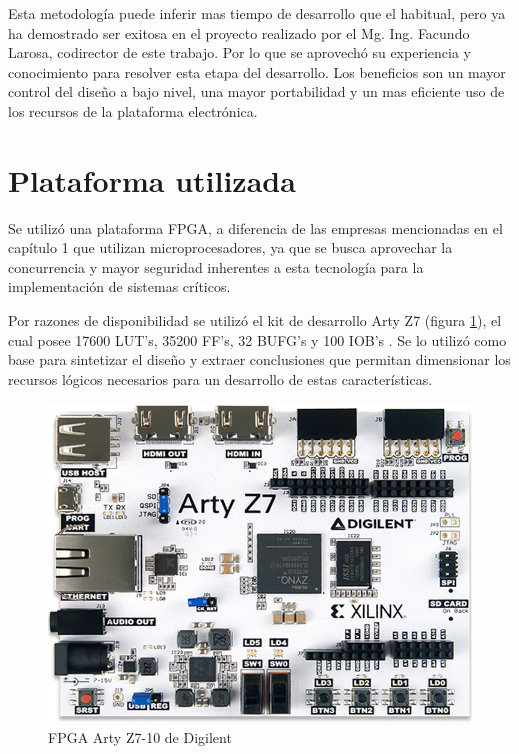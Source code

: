 	Esta metodología puede inferir mas tiempo de desarrollo que el habitual, pero ya ha demostrado ser exitosa en el proyecto realizado por el Mg. Ing. Facundo Larosa, codirector de este trabajo. Por lo que se aprovechó su experiencia y conocimiento para resolver esta etapa del desarrollo. Los beneficios son un mayor control del diseño a bajo nivel, una mayor portabilidad y un mas eficiente uso de los recursos de la plataforma electrónica.


\section{Plataforma utilizada}

	Se utilizó una plataforma FPGA, a diferencia de las empresas mencionadas en el capítulo 1 que utilizan microprocesadores, ya que se busca aprovechar la concurrencia y mayor seguridad inherentes a esta tecnología \cite{cite23,cite24,cite25} para la implementación de sistemas
críticos.

	Por razones de disponibilidad se utilizó el kit de desarrollo Arty Z7  (figura \ref{fig:FPGA}), el cual posee 17600 LUT’s, 35200 FF’s, 32 BUFG’s y 100 IOB’s \cite{cite28}. Se lo utilizó como base para sintetizar el diseño y extraer conclusiones que permitan dimensionar los recursos lógicos necesarios para un desarrollo de estas características.
	
	\begin{figure}[h]
	\centering
		\includegraphics[scale=.55]{./Figures/FPGA}
		\caption{FPGA Arty Z7-10 de Digilent}
	\label{fig:FPGA}	
	\end{figure}			
			
